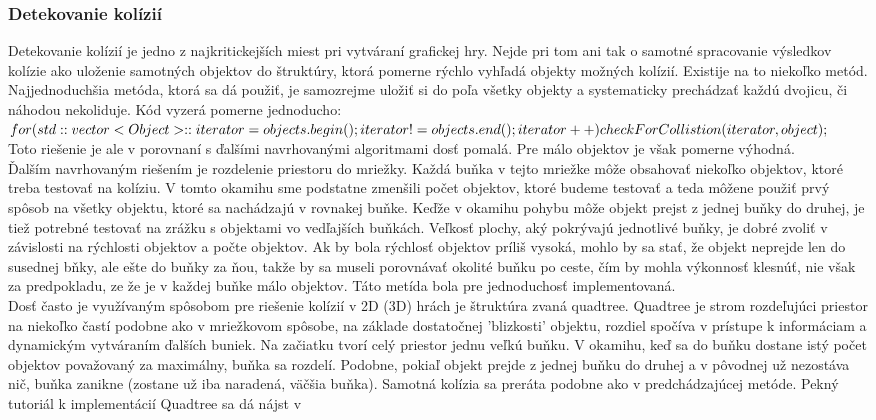 \subsubsection{Detekovanie kolízií}%
Detekovanie kolízií je jedno z najkritickejších miest pri vytváraní grafickej hry. Nejde pri tom ani tak o samotné spracovanie výsledkov kolízie ako uloženie samotných objektov do štruktúry, ktorá pomerne rýchlo vyhľadá objekty možných kolízií. Existije na to niekoľko metód.\\
Najjednoduchšia metóda, ktorá sa dá použiť, je samozrejme uložiť si do poľa všetky objekty a systematicky prechádzať každú dvojicu, či náhodou nekoliduje. Kód vyzerá pomerne jednoducho:\\ $ for(std::vector<Object>::iterator = objects.begin();\\ iterator!=objects.end();\\ iterator++)\\ \\ checkForCollistion(iterator, object);$\\
Toto riešenie je ale v porovnaní s ďalšími navrhovanými algoritmami dosť pomalá. Pre málo objektov je však pomerne výhodná.\\
Ďalším navrhovaným riešením je rozdelenie priestoru do mriežky. Každá buňka v tejto mriežke môže obsahovať niekoľko objektov, ktoré treba testovať na kolíziu. V tomto okamihu sme podstatne zmenšili počet objektov, ktoré budeme testovať a teda môžene použiť prvý spôsob na všetky objektu, ktoré sa nachádzajú v rovnakej buňke. Keďže v okamihu pohybu môže objekt prejst z jednej buňky do druhej, je tiež potrebné testovať na zrážku s objektami vo vedľajších buňkách. Veľkosť plochy, aký pokrývajú jednotlivé buňky, je dobré zvoliť v závislosti na rýchlosti objektov a počte objektov. Ak by bola rýchlosť objektov príliš vysoká, mohlo by sa stať, že objekt neprejde len do susednej bňky, ale ešte do buňky za ňou, takže by sa museli porovnávať okolité buňku po ceste, čím by mohla výkonnosť klesnúť, nie však za predpokladu, ze že je v každej buňke málo objektov. Táto metída bola pre jednoduchosť implementovaná.\\%
Dosť často je využívaným spôsobom pre riešenie kolízií v 2D (3D) hrách je štruktúra zvaná quadtree. Quadtree je strom rozdeľujúci priestor na niekoľko častí podobne ako v mriežkovom spôsobe, na základe dostatočnej 'blizkosti' objektu, rozdiel spočíva v prístupe k informáciam a dynamickým vytváraním ďalších buniek. Na začiatku tvorí celý priestor jednu veľkú buňku. V okamihu, keď sa do buňku dostane istý počet objektov považovaný za maximálny, buňka sa rozdelí. Podobne, pokiaľ objekt prejde z jednej buňku do druhej a v pôvodnej už nezostáva nič, buňka zanikne (zostane už iba naradená, väčšia buňka). Samotná kolízia sa preráta podobne ako v predchádzajúcej metóde. Pekný tutoriál k implementácií Quadtree sa dá  nájst v \cite{quadtree}
